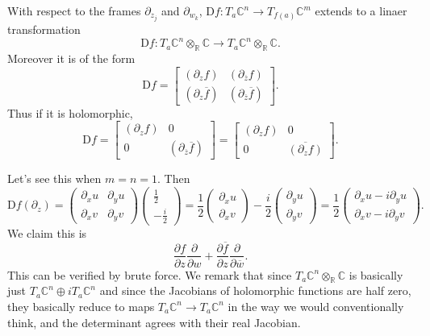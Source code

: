 \begin{claim}
	With respect to the frames $\partial _{z_j} $ and $\partial _{w_k} $, $\mathrm{D} f : T_a\mathbb{C} ^n \to T_{f(a)} \mathbb{C} ^m$ extends to a linaer transformation
	\[
		\mathrm{D} f : T_a\mathbb{C} ^n\otimes _\mathbb{R} \mathbb{C}  \to T_a\mathbb{C} ^n\otimes _\mathbb{R} \mathbb{C} 
	.\]
	Moreover it is of the form
	\[
		\mathrm{D} f=\begin{bmatrix}
			(\partial _zf) & (\partial_{\overline{z} } f) \\
			(\partial _z \overline{f})  & (\partial _{\overline{z} } \overline{f} )
		\end{bmatrix}
	.\]
	Thus if it is holomorphic,
	\[
		\mathrm{D} f=\begin{bmatrix}
			(\partial _zf) & 0 \\
		0 & (\partial _{\overline{z} } \overline{f} )
		\end{bmatrix}=\begin{bmatrix}
		(\partial _zf) & 0 \\
		0 & \overline{(\partial _zf)} 
		\end{bmatrix}
	.\]
\end{claim}

Let's see this when $m=n=1$. Then
\[
	\mathrm{D} f(\partial _z)=\begin{pmatrix}
	\partial _xu & \partial _yu \\
	\partial _xv & \partial _yv
	\end{pmatrix}\begin{pmatrix}
	\frac{1}{2}  \\
	-\frac{i}{2} 
	\end{pmatrix}=\frac{1}{2} \begin{pmatrix}
	\partial _xu \\
	\partial _xv
	\end{pmatrix}-\frac{i}{2} \begin{pmatrix}
	\partial _yu \\
	\partial _yv 
	\end{pmatrix}=\frac{1}{2} \begin{pmatrix}
	\partial _xu-i \partial _yu \\
	\partial _xv-i \partial _yv
	\end{pmatrix}
.\]
We claim this is
\[
	\frac{\partial f}{\partial z} \frac{\partial }{\partial w} +\frac{\partial \overline{f} }{\partial z} \frac{\partial }{\partial \overline{w} } 
.\]
This can be verified by brute force. We remark that since $T_a\mathbb{C} ^n \otimes _\mathbb{R} \mathbb{C} $ is basically just $T_a\mathbb{C} ^n \oplus iT_a\mathbb{C} ^n$ and since the Jacobians of holomorphic functions are half zero, they basically reduce to maps $T_a\mathbb{C} ^n\to T_a\mathbb{C} ^n$ in the way we would conventionally think, and the determinant agrees with their real Jacobian.
